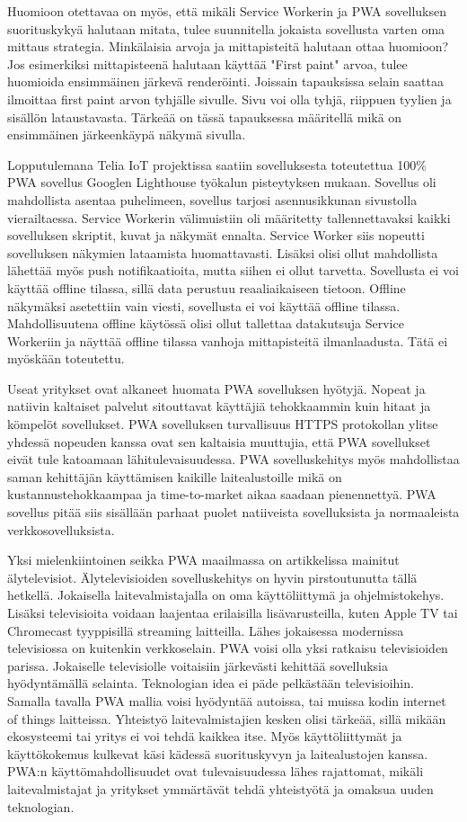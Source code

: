 \documentclass{tktltiki}
\begin{document}
Huomioon otettavaa on myös, että mikäli Service Workerin ja PWA sovelluksen suorituskykyä halutaan mitata, tulee suunnitella jokaista sovellusta varten oma mittaus strategia. Minkälaisia arvoja ja mittapisteitä halutaan ottaa huomioon? Jos esimerkiksi mittapisteenä halutaan käyttää "First paint" arvoa, tulee huomioida ensimmäinen järkevä renderöinti. Joissain tapauksissa selain saattaa ilmoittaa first paint arvon tyhjälle sivulle. Sivu voi olla tyhjä, riippuen tyylien ja sisällön lataustavasta. Tärkeää on tässä tapauksessa määritellä mikä on ensimmäinen järkeenkäypä näkymä sivulla.  

Lopputulemana Telia IoT projektissa saatiin sovelluksesta toteutettua 100\% PWA sovellus Googlen Lighthouse työkalun pisteytyksen mukaan. Sovellus oli mahdollista asentaa puhelimeen, sovellus tarjosi asennusikkunan sivustolla vierailtaessa. Service Workerin välimuistiin oli määritetty tallennettavaksi kaikki sovelluksen skriptit, kuvat ja näkymät ennalta. Service Worker siis nopeutti sovelluksen näkymien lataamista huomattavasti. Lisäksi olisi ollut mahdollista lähettää myös push notifikaatioita, mutta siihen ei ollut tarvetta. Sovellusta ei voi käyttää offline tilassa, sillä data perustuu reaaliaikaiseen tietoon. Offline näkymäksi asetettiin vain viesti, sovellusta ei voi käyttää offline tilassa. Mahdollisuutena offline käytössä olisi ollut tallettaa datakutsuja Service Workeriin ja näyttää offline tilassa vanhoja mittapisteitä ilmanlaadusta. Tätä ei myöskään toteutettu.

Useat yritykset ovat alkaneet huomata PWA sovelluksen hyötyjä. Nopeat ja natiivin kaltaiset palvelut sitouttavat käyttäjiä tehokkaammin kuin hitaat ja kömpelöt sovellukset. PWA sovelluksen turvallisuus HTTPS protokollan ylitse yhdessä nopeuden kanssa ovat sen kaltaisia muuttujia, että PWA sovellukset eivät tule katoamaan lähitulevaisuudessa. \cite{8441701} PWA sovelluskehitys myös mahdollistaa saman kehittäjän käyttämisen kaikille laitealustoille mikä on kustannustehokkaampaa ja time-to-market aikaa saadaan pienennettyä. PWA sovellus pitää siis sisällään parhaat puolet natiiveista sovelluksista ja normaaleista verkkosovelluksista. 

Yksi mielenkiintoinen seikka PWA maailmassa on artikkelissa \cite{8287006} mainitut älytelevisiot. Älytelevisioiden sovelluskehitys on hyvin pirstoutunutta tällä hetkellä. Jokaisella laitevalmistajalla on oma käyttöliittymä ja ohjelmistokehys. Lisäksi televisioita voidaan laajentaa erilaisilla lisävarusteilla, kuten Apple TV tai Chromecast tyyppisillä streaming laitteilla. Lähes jokaisessa modernissa televisiossa on kuitenkin verkkoselain. PWA voisi olla yksi ratkaisu televisioiden parissa. Jokaiselle televisiolle voitaisiin järkevästi kehittää sovelluksia hyödyntämällä selainta. Teknologian idea ei päde pelkästään televisioihin. Samalla tavalla PWA mallia voisi hyödyntää autoissa, tai muissa kodin internet of things laitteissa. Yhteistyö laitevalmistajien kesken olisi tärkeää, sillä mikään ekosysteemi tai yritys ei voi tehdä kaikkea itse. Myös käyttöliittymät ja käyttökokemus kulkevat käsi kädessä suorituskyvyn ja laitealustojen kanssa. PWA:n käyttömahdollisuudet ovat tulevaisuudessa lähes rajattomat, mikäli laitevalmistajat ja yritykset ymmärtävät tehdä yhteistyötä ja omaksua uuden teknologian. 
\end{document}
